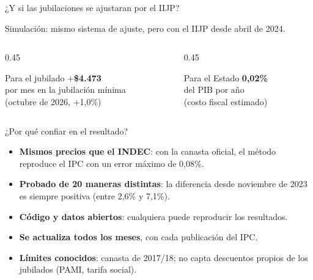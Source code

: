 \documentclass[aspectratio=169,11pt]{beamer}
\begin{document}
\begin{frame}{¿Y si las jubilaciones se ajustaran por el IIJP?}
  \begin{center}
    Simulación: mismo sistema de ajuste, pero con el IIJP desde abril de 2024.
  \end{center}
  \vspace{0.8em}
  \begin{columns}[t]
    \begin{column}{0.45\textwidth}
      \begin{block}{Para el jubilado}
        \centering
        {\Huge\bfseries\color{azul} $+$\$4.473}\\[0.4em]
        por mes en la jubilación mínima\\
        (octubre de 2026, $+$1,0\%)
      \end{block}
    \end{column}
    \begin{column}{0.45\textwidth}
      \begin{block}{Para el Estado}
        \centering
        {\Huge\bfseries\color{azul} 0,02\%}\\[0.4em]
        del PIB por año\\
        (costo fiscal estimado)
      \end{block}
    \end{column}
  \end{columns}
\end{frame}

\begin{frame}{¿Por qué confiar en el resultado?}
  \begin{itemize}
    \setlength{\itemsep}{0.6em}
    \item \textbf{Mismos precios que el INDEC}: con la canasta oficial, el método reproduce el IPC con un error máximo de 0,08\%.
    \item \textbf{Probado de 20 maneras distintas}: la diferencia desde noviembre de 2023 es siempre positiva (entre 2,6\% y 7,1\%).
    \item \textbf{Código y datos abiertos}: cualquiera puede reproducir los resultados.
    \item \textbf{Se actualiza todos los meses}, con cada publicación del IPC.
    \item \textbf{Límites conocidos}: canasta de 2017/18; no capta descuentos propios de los jubilados (PAMI, tarifa social).
  \end{itemize}
\end{frame}
\end{document}
